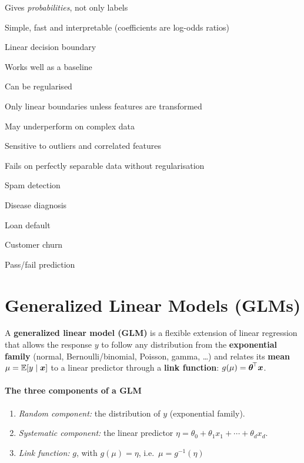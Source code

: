 {\item Gives \emph{probabilities}, not only labels
 \item Simple, fast and interpretable (coefficients are log-odds ratios)
 \item Linear decision boundary
 \item Works well as a baseline
 \item Can be regularised}
{\item Only linear boundaries unless features are transformed
 \item May underperform on complex data
 \item Sensitive to outliers and correlated features
 \item Fails on perfectly separable data without regularisation}
{\item Spam detection
 \item Disease diagnosis
 \item Loan default
 \item Customer churn
 \item Pass/fail prediction}

\section{Generalized Linear Models (GLMs)}


\begin{definition}
A \textbf{generalized linear model (GLM)} is a flexible extension of linear regression that allows the response $y$ to follow any distribution from the \textbf{exponential family} (normal, Bernoulli/binomial, Poisson, gamma, \dots) and relates its \textbf{mean} $\mu=\mathbb{E}[y\mid\boldsymbol{x}]$ to a linear predictor through a \textbf{link function}: $g(\mu)=\boldsymbol{\theta}^{\!\top}\boldsymbol{x}$.
\end{definition}



\paragraph{The three components of a GLM}
\begin{enumerate}
  \item \emph{Random component:} the distribution of $y$ (exponential family).
  \item \emph{Systematic component:} the linear predictor $\eta=\theta_0+\theta_1x_1+\cdots+\theta_dx_d$.
  \item \emph{Link function:} $g$, with $g(\mu)=\eta$, i.e.\ $\mu=g^{-1}(\eta)$
\end{enumerate}


